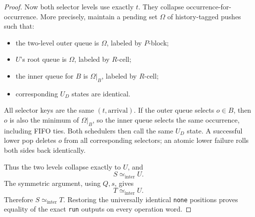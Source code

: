 \documentclass{amsart}
\theoremstyle{plain}
\theoremstyle{definition}
\begin{document}
\begin{proof}
Now both selector levels use exactly $t$. They collapse occurrence-for-occurrence. More precisely, maintain a pending set $\Omega$ of history-tagged pushes such that:
\begin{itemize}
\item the two-level outer queue is $\Omega$, labeled by $P$-block;
\item $U$'s root queue is $\Omega$, labeled by $R$-cell;
\item the inner queue for $B$ is $\Omega|_B$, labeled by $R$-cell;
\item corresponding $U_D$ states are identical.
\end{itemize}
All selector keys are the same $(t,\text{arrival})$. If the outer queue selects $o\in B$, then $o$ is also the minimum of $\Omega|_B$, so the inner queue selects the same occurrence, including FIFO ties. Both schedulers then call the same $U_D$ state. A successful lower pop deletes $o$ from all corresponding selectors; an atomic lower failure rolls both sides back identically.

Thus the two levels collapse exactly to $U$, and
\begin{equation*}
S\simeq_{\mathrm{inter}}U. \tag{20}
\end{equation*}
The symmetric argument, using $Q,s$, gives
\begin{equation*}
T\simeq_{\mathrm{inter}}U. \tag{21}
\end{equation*}
Therefore $S\simeq_{\mathrm{inter}}T$. Restoring the universally identical \texttt{none} positions proves equality of the exact \texttt{run} outputs on every operation word.
\end{proof}
\end{document}
